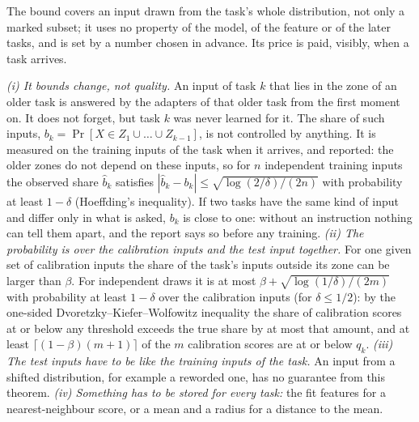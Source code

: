 The bound covers an input drawn from the task's whole distribution, not only a marked subset; it uses no property of
the model, of the feature or of the later tasks, and is set by a number chosen in advance. Its price is paid, visibly, when a task arrives.

\begin{remark}
\label{rem:boundlimits}
\emph{(i) It bounds change, not quality.} An input of task $k$ that lies in the zone of an older
task is answered by the adapters of that older task from the first moment on. It does not forget,
but task $k$ was never learned for it. The share of such inputs,
$b_k = \Pr[X \in Z_1 \cup \dots \cup Z_{k-1}]$, is not controlled by anything. It is measured on the
training inputs of the task when it arrives, and reported: the older zones do not depend on these
inputs, so for $n$ independent training inputs the observed share $\hat b_k$ satisfies
$|\hat b_k - b_k| \le \sqrt{\log(2/\delta)/(2n)}$ with probability at least $1 - \delta$
(Hoeffding's inequality). If two tasks have the same kind of input and differ only in what is asked,
$b_k$ is close to one: without an instruction nothing can tell them apart, and the report says so
before any training.
\emph{(ii) The probability is over the calibration inputs and the test input together.} For one
given set of calibration inputs the share of the task's inputs outside its zone can be larger than
$\beta$. For independent draws it is at most $\beta + \sqrt{\log(1/\delta)/(2m)}$ with probability
at least $1 - \delta$ over the calibration inputs (for $\delta \le 1/2$): by the one-sided
Dvoretzky--Kiefer--Wolfowitz inequality
the share of calibration scores at or below any threshold exceeds the true share by at most that
amount, and at least $\lceil (1-\beta)(m+1) \rceil$ of the $m$ calibration scores are at or below
$q_k$.
\emph{(iii) The test inputs have to be like the training inputs of the task.} An input from a
shifted distribution, for example a reworded one, has no guarantee from this theorem.
\emph{(iv) Something has to be stored for every task:} the fit features for a nearest-neighbour
score, or a mean and a radius for a distance to the mean.
\end{remark}
